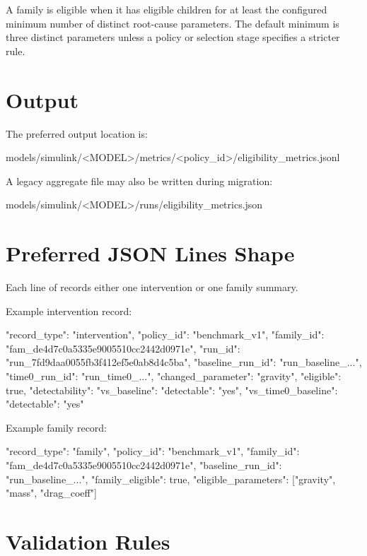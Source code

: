 \documentclass[11pt]{article}
\begin{document}
A family is eligible when it has eligible children for at least the configured minimum number of distinct root-cause parameters.
The default minimum is three distinct parameters unless a policy or selection stage specifies a stricter rule.

\section*{Output}

The preferred output location is:

\begin{DocCode}
models/simulink/<MODEL>/metrics/<policy_id>/eligibility_metrics.jsonl
\end{DocCode}

A legacy aggregate file may also be written during migration:

\begin{DocCode}
models/simulink/<MODEL>/runs/eligibility_metrics.json
\end{DocCode}

\section*{Preferred JSON Lines Shape}

Each line of  records either one intervention or one family summary.

Example intervention record:

\begin{DocCode}
{
  "record_type": "intervention",
  "policy_id": "benchmark_v1",
  "family_id": "fam_de4d7c0a5335e9005510cc2442d0971e",
  "run_id": "run_7fd9daa0055fb3f412ef5e0ab8d4c5ba",
  "baseline_run_id": "run_baseline_...",
  "time0_run_id": "run_time0_...",
  "changed_parameter": "gravity",
  "eligible": true,
  "detectability": {
    "vs_baseline": {"detectable": "yes"},
    "vs_time0_baseline": {"detectable": "yes"}
  }
}
\end{DocCode}

Example family record:

\begin{DocCode}
{
  "record_type": "family",
  "policy_id": "benchmark_v1",
  "family_id": "fam_de4d7c0a5335e9005510cc2442d0971e",
  "baseline_run_id": "run_baseline_...",
  "family_eligible": true,
  "eligible_parameters": ["gravity", "mass", "drag_coeff"]
}
\end{DocCode}

\section*{Validation Rules}
\end{document}
